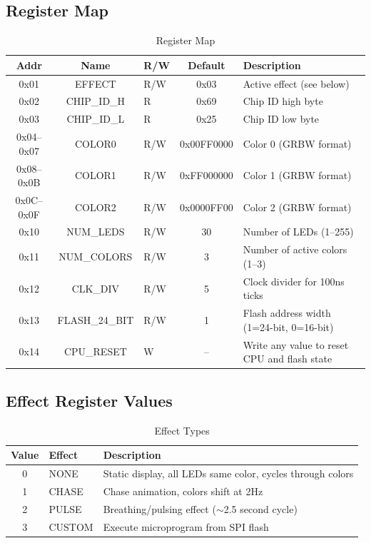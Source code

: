 \documentclass[11pt,a4paper]{article}
\begin{document}
\subsection{Register Map}

\begin{table}[H]
\centering
\caption{Register Map}
\begin{tabular}{@{}cclcl@{}}
\toprule
\textbf{Addr} & \textbf{Name} & \textbf{R/W} & \textbf{Default} & \textbf{Description} \\
\midrule
0x01 & EFFECT & R/W & 0x03 & Active effect (see below) \\
0x02 & CHIP\_ID\_H & R & 0x69 & Chip ID high byte \\
0x03 & CHIP\_ID\_L & R & 0x25 & Chip ID low byte \\
0x04--0x07 & COLOR0 & R/W & 0x00FF0000 & Color 0 (GRBW format) \\
0x08--0x0B & COLOR1 & R/W & 0xFF000000 & Color 1 (GRBW format) \\
0x0C--0x0F & COLOR2 & R/W & 0x0000FF00 & Color 2 (GRBW format) \\
0x10 & NUM\_LEDS & R/W & 30 & Number of LEDs (1--255) \\
0x11 & NUM\_COLORS & R/W & 3 & Number of active colors (1--3) \\
0x12 & CLK\_DIV & R/W & 5 & Clock divider for 100ns ticks \\
0x13 & FLASH\_24\_BIT & R/W & 1 & Flash address width (1=24-bit, 0=16-bit) \\
0x14 & CPU\_RESET & W & -- & Write any value to reset CPU and flash state \\
\bottomrule
\end{tabular}
\end{table}

\subsection{Effect Register Values}

\begin{table}[H]
\centering
\caption{Effect Types}
\begin{tabular}{@{}clp{8cm}@{}}
\toprule
\textbf{Value} & \textbf{Effect} & \textbf{Description} \\
\midrule
0 & NONE & Static display, all LEDs same color, cycles through colors \\
1 & CHASE & Chase animation, colors shift at 2Hz \\
2 & PULSE & Breathing/pulsing effect ($\sim$2.5 second cycle) \\
3 & CUSTOM & Execute microprogram from SPI flash \\
\bottomrule
\end{tabular}
\end{table}
\end{document}
